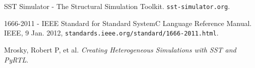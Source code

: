 \documentclass{article}
\begin{document}
  \begin{thebibliography}{5}

     SST Simulator - The Structural Simulation Toolkit. \texttt{sst-simulator.org}.

     1666-2011 - IEEE Standard for Standard SystemC Language Reference Manual. IEEE, 9
    Jan. 2012, \texttt{standards.ieee.org/standard/1666-2011.html}.

     Mrosky, Robert P, et al.
    \textit{Creating Heterogeneous Simulations with SST and PyRTL}.

  \end{thebibliography}
\end{document}
